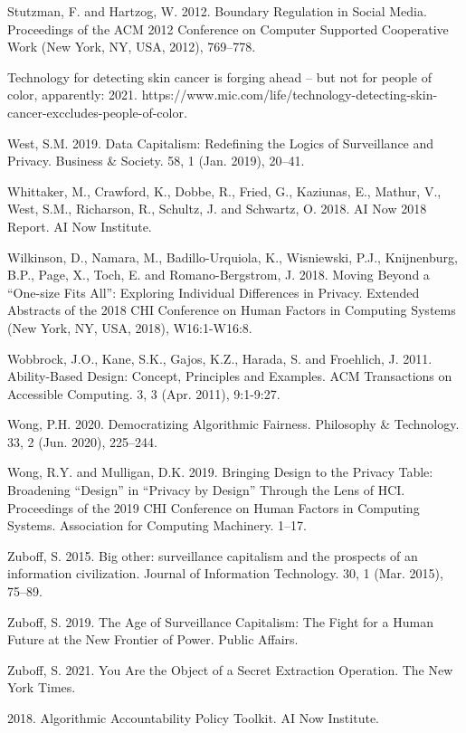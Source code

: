 \documentclass[11pt,dvipdfm]{article}
\begin{document}
\begin{thebibliography}{10}
\begin{small}
Stutzman, F. and Hartzog, W. 2012. Boundary Regulation in Social Media. Proceedings of the ACM 2012 Conference on Computer Supported Cooperative Work (New York, NY, USA, 2012), 769–778.

Technology for detecting skin cancer is forging ahead – but not for people of color, apparently: 2021. https://www.mic.com/life/technology-detecting-skin-cancer-exccludes-people-of-color. 

West, S.M. 2019. Data Capitalism: Redefining the Logics of Surveillance and Privacy. Business \& Society. 58, 1 (Jan. 2019), 20–41. 

Whittaker, M., Crawford, K., Dobbe, R., Fried, G., Kaziunas, E., Mathur, V., West, S.M., Richarson, R., Schultz, J. and Schwartz, O. 2018. AI Now 2018 Report. AI Now Institute.

Wilkinson, D., Namara, M., Badillo-Urquiola, K., Wisniewski, P.J., Knijnenburg, B.P., Page, X., Toch, E. and Romano-Bergstrom, J. 2018. Moving Beyond a “One-size Fits All”: Exploring Individual Differences in Privacy. Extended Abstracts of the 2018 CHI Conference on Human Factors in Computing Systems (New York, NY, USA, 2018), W16:1-W16:8.

Wobbrock, J.O., Kane, S.K., Gajos, K.Z., Harada, S. and Froehlich, J. 2011. Ability-Based Design: Concept, Principles and Examples. ACM Transactions on Accessible Computing. 3, 3 (Apr. 2011), 9:1-9:27. 

Wong, P.H. 2020. Democratizing Algorithmic Fairness. Philosophy \& Technology. 33, 2 (Jun. 2020), 225–244. 

Wong, R.Y. and Mulligan, D.K. 2019. Bringing Design to the Privacy Table: Broadening “Design” in “Privacy by Design” Through the Lens of HCI. Proceedings of the 2019 CHI Conference on Human Factors in Computing Systems. Association for Computing Machinery. 1–17.

Zuboff, S. 2015. Big other: surveillance capitalism and the prospects of an information civilization. Journal of Information Technology. 30, 1 (Mar. 2015), 75–89.

Zuboff, S. 2019. The Age of Surveillance Capitalism: The Fight for a Human Future at the New Frontier of Power. Public Affairs.

Zuboff, S. 2021. You Are the Object of a Secret Extraction Operation. The New York Times.

2018. Algorithmic Accountability Policy Toolkit. AI Now Institute. \end{small}
\end{thebibliography}
\end{document}
